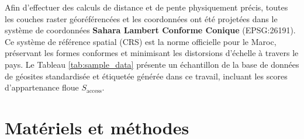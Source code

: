 \documentclass[11pt,twocolumn,a4paper]{article}
\begin{document}
Afin d'effectuer des calculs de distance et de pente physiquement précis, toutes les couches raster géoréférencées et les coordonnées ont été projetées dans le système de coordonnées \textbf{Sahara Lambert Conforme Conique} (EPSG:26191). Ce système de référence spatial (CRS) est la norme officielle pour le Maroc, préservant les formes conformes et minimisant les distorsions d'échelle à travers le pays. Le Tableau \ref{tab:sample_data} présente un échantillon de la base de données de géosites standardisée et étiquetée générée dans ce travail, incluant les scores d'appartenance floue $S_{\text{access}}$.

\begin{table}[t]
    \centering
    \caption{Extrait du jeu de données des géosites marocains compilé et étiqueté montrant toutes les caractéristiques physiques, routières et le score flou Fuzzy MCDSS ($S_{\text{access}}$) (5 enregistrements d'échantillon)}
    \label{tab:sample_data}
\end{table}

\section{Matériels et méthodes}
\end{document}
